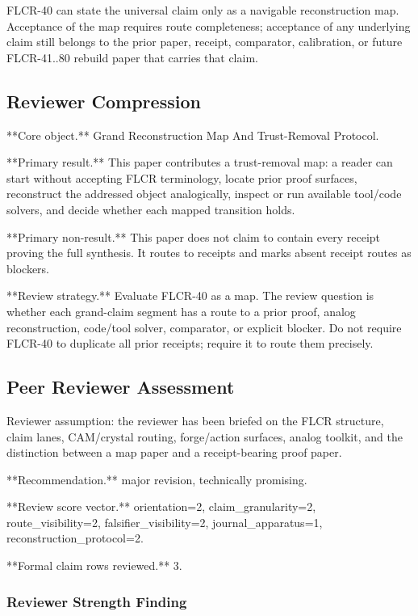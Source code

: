 \documentclass[11pt]{article}
\begin{document}
FLCR-40 can state the universal claim only as a navigable reconstruction map. Acceptance of the map requires route completeness; acceptance of any underlying claim still belongs to the prior paper, receipt, comparator, calibration, or future FLCR-41..80 rebuild paper that carries that claim.


\subsection*{Reviewer Compression}

**Core object.** Grand Reconstruction Map And Trust-Removal Protocol.

**Primary result.** This paper contributes a trust-removal map: a reader can start without accepting FLCR terminology, locate prior proof surfaces, reconstruct the addressed object analogically, inspect or run available tool/code solvers, and decide whether each mapped transition holds.

**Primary non-result.** This paper does not claim to contain every receipt proving the full synthesis. It routes to receipts and marks absent receipt routes as blockers.

**Review strategy.** Evaluate FLCR-40 as a map. The review question is whether each grand-claim segment has a route to a prior proof, analog reconstruction, code/tool solver, comparator, or explicit blocker. Do not require FLCR-40 to duplicate all prior receipts; require it to route them precisely.


\subsection*{Peer Reviewer Assessment}

Reviewer assumption: the reviewer has been briefed on the FLCR structure, claim lanes, CAM/crystal routing, forge/action surfaces, analog toolkit, and the distinction between a map paper and a receipt-bearing proof paper.

**Recommendation.** major revision, technically promising.

**Review score vector.** orientation=2, claim\_granularity=2, route\_visibility=2, falsifier\_visibility=2, journal\_apparatus=1, reconstruction\_protocol=2.

**Formal claim rows reviewed.** 3.

\subsubsection*{Reviewer Strength Finding}
\end{document}
